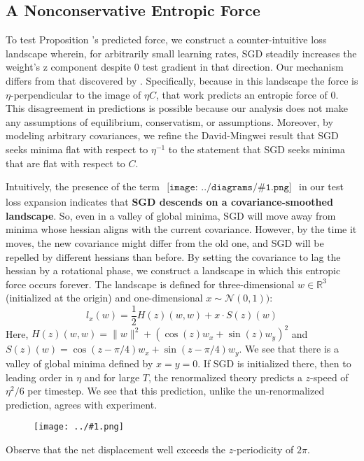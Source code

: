 \documentclass{article}
\newcommand{\Nn}{\mathcal{N}}
\newcommand{\RR}{\mathbb{R}}
\newcommand{\plotplace}[3]{
    \begin{overpic}[width=#2, height=#3]{../plots/blank.png}
        \put( 5, 85){
            \begin{tabular}{p{#2-1.0cm}}
                #1
            \end{tabular}
        }
    \end{overpic}
}
\newcommand{\plotmoo}[3]{
    \texttt{[image: ../\#1.png]}
}
\newcommand{\sdia}[1]{\begin{gathered}\texttt{[image: ../diagrams/\#1.png]}\end{gathered}}
\newcommand{\lorem}[1]{
    Lorem ipsum dolor sit amet, consectetur adipiscing elit...\\
    \nopagebreak\vspace{#1cm} \ \\
    ...sunt in culpa qui officia deserunt mollit anim id est laborum.
}
\begin{document}
    \subsection{A Nonconservative Entropic Force}
        To test Proposition \label{prop:entropic}'s predicted force, 
        we construct a counter-intuitive loss landscape wherein, for
        arbitrarily small learning rates, SGD steadily increases the weight's
        z component despite 0 test gradient in that direction.
        Our mechanism differs from that discovered by \citet{ch18}.
        Specifically, because in this landscape the force is
        $\eta$-perpendicular to the image of $\eta C$, that work predicts an
        entropic force of $0$.  This disagreement in predictions is possible
        because our analysis does not make any assumptions of equilibrium,
        conservatism, or assumptions.
        Moreover, by modeling arbitrary covariances, we refine the
        David-Mingwei result that SGD seeks minima flat with respect to
        $\eta^{-1}$ to the statement that SGD seeks minima that are flat with
        respect to $C$.

        Intuitively, the presence of the term
        $
            \sdia{c(01-2-3)(02-12-23)}
        $
        in our test loss expansion indicates that 
        {\bf SGD descends on a covariance-smoothed landscape}.
        So, even in a valley of global minima, SGD will move away from minima
        whose hessian aligns with the current covariance.  However, by the time
        it moves, the new covariance might differ from the old one, and SGD will
        be repelled by different hessians than before.  By setting the
        covariance to lag the hessian by a rotational phase, we construct
        a landscape in which this entropic force occurs forever. 
        The landscape is defined for
        three-dimensional $w\in \RR^3$ (initialized at the origin) and
        one-dimensional $x \sim \Nn(0, 1))$:
        $$
            l_x(w) = \frac{1}{2} H(z)(w, w) + x \cdot S(z)(w)  
        $$
        Here, $H(z)(w, w) = \|w\|^2 + (\cos(z) w_x + \sin(z) w_y)^2$
        and   $S(z)(w)    = \cos(z-\pi/4) w_x + \sin(z-\pi/4) w_y$.
        We see that there is a valley of global minima defined by $x=y=0$. 
        If SGD is initialized there, then to leading order in $\eta$ and for
        large $T$, the renormalized theory predicts a $z$-speed of $\eta^2/6$ 
        per timestep.  We see that this prediction, unlike the
        un-renormalized prediction, agrees with experiment.
        \begin{figure}[h!]
            \centering
            \plotmoo{plots/thermo-linear-screw}{0.98\columnwidth}{4.0cm}
        \end{figure}
        Observe that the net displacement well exceeds the $z$-periodicity of
        $2\pi$. 
\end{document}
